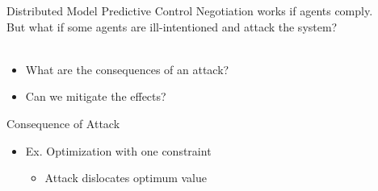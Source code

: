 \documentclass[aspectratio=169]{beamer}
\begin{document}
\begin{frame}{Distributed Model Predictive Control}
  Negotiation works if agents comply.\\\pause
  But what if some agents are ill-intentioned and attack the system?\\~\\\pause
  \begin{itemize}
    \item What are the consequences of an attack?\pause
    \item Can we mitigate the effects?
  \end{itemize}
\end{frame}

\begin{frame}{Consequence of Attack}
  \begin{overlayarea}{\textwidth}{.5\textwidth}
    \begin{itemize}[<+(1)->]
      \item Ex. Optimization with one constraint
            \begin{itemize}[<+(1)->]
              \item Attack dislocates optimum value
            \end{itemize}
    \end{itemize}
\end{overlayarea}
\end{frame}
\end{document}
